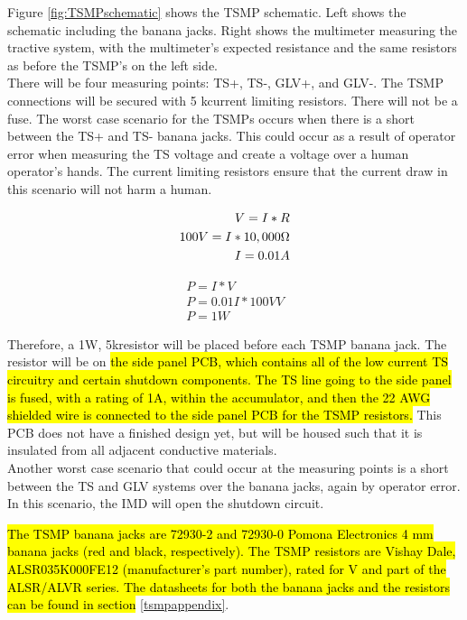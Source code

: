 \documentclass{article}
\DeclareRobustCommand{\hlr}[1]{{\sethlcolor{red}\hl{#1}}}
\begin{document}
            Figure \ref{fig:TSMPschematic} shows the TSMP schematic. Left shows the schematic including the banana jacks. Right shows the multimeter measuring the tractive system, with the multimeter's expected resistance and the same resistors as before the TSMP's on the left side.\\

            There will be four measuring points: TS+, TS-, GLV+, and GLV-. The TSMP connections will be secured with 5 k\ohm current limiting resistors. There will not be a fuse. The worst case scenario for the TSMPs occurs when there is a short between the TS+ and TS- banana jacks. This could occur as a result of operator error when measuring the TS  voltage and create a voltage over a human operator's hands. The current limiting resistors ensure that the current draw in this scenario will not harm a human.

            \begin{align}
                V = I * R \\
                100 V = I * 10,000 \ohm \\
                I = 0.01A
            \end{align}

            \begin{align}
                P = I * V \\
                P = 0.01 I * 100V V \\
                P = 1 W
            \end{align}

            Therefore, a 1W, 5k\ohm resistor will be placed before each TSMP banana jack. The resistor will be on \hlr{the side panel PCB, which contains all of the low current TS circuitry and certain shutdown components. The TS line going to the side panel is fused, with a rating of 1A, within the accumulator, and then the 22 AWG shielded wire is connected to the side panel PCB for the TSMP resistors.} This PCB does not have a finished design yet, but will be housed such that it is insulated from all adjacent conductive materials.\\

            Another worst case scenario that could occur at the measuring points is a short between the TS and GLV systems over the banana jacks, again by operator error. In this scenario, the IMD will open the shutdown circuit.

            \hlr{The TSMP banana jacks are 72930-2 and 72930-0 Pomona Electronics 4 mm banana jacks (red and black, respectively). The TSMP resistors are Vishay Dale, ALSR035K000FE12 (manufacturer's part number), rated for V and part of the ALSR/ALVR series. The datasheets for both the banana jacks and the resistors can be found in section} \ref{tsmpappendix}.
\end{document}
